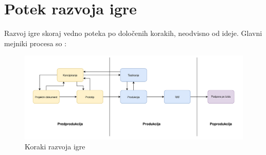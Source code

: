 \documentclass[12pt,a4paper,twoside]{book}
\begin{document}
\section{Potek razvoja igre}
Razvoj igre skoraj vedno poteka po določenih korakih, neodvisno od ideje. Glavni mejniki procesa so \cite{jainGameDevelopmentCycle}:
\begin{figure}[h]
	\centering
	\includegraphics[width=15cm]{LifeCycle}
	\caption{Koraki razvoja igre}
	\label{slika:lifeCycle}
	\vspace*{-2em}
\end{figure}
\end{document}
